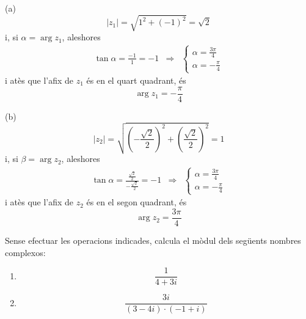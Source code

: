 \begin{solucio}
(a)
\begin{equation*}
\left\vert z_{1}\right\vert =\sqrt{1^{2}+(-1)^{2}}=\sqrt{2}
\end{equation*}
i, si $\alpha =\arg z_{1}$, aleshores
\begin{equation*}
\begin{array}{lll}
\tan \alpha =\frac{-1}{1}=-1 & \Longrightarrow & \left\{
\begin{array}{l}
\alpha =\frac{3\pi }{4} \\
\alpha =-\frac{\pi }{4}
\end{array}
\right.
\end{array}
\end{equation*}
i atès que l’afix de $z_{1}$ és en el quart quadrant, és
\begin{equation*}
\arg z_{1}=-\frac{\pi }{4}
\end{equation*}

(b)
\begin{equation*}
\left\vert z_{2}\right\vert =\sqrt{\left( -\frac{\sqrt{2}}{2}\right)
^{2}+\left( \frac{\sqrt{2}}{2}\right) ^{2}}=1
\end{equation*}
i, si $\beta =\arg z_{2}$, aleshores
\begin{equation*}
\begin{array}{lll}
\tan \alpha =\frac{\frac{\sqrt{2}}{2}}{-\frac{\sqrt{2}}{2}}=-1 &
\Longrightarrow & \left\{
\begin{array}{l}
\alpha =\frac{3\pi }{4} \\
\alpha =-\frac{\pi }{4}
\end{array}
\right.
\end{array}
\end{equation*}
i atès que l’afix de $z_{2}$ és en el segon quadrant, és
\begin{equation*}
\arg z_{2}=\frac{3\pi }{4}
\end{equation*}
\end{solucio}

\begin{exemple}
Sense efectuar les operacions indicades, calcula el mòdul dels
següents nombres complexos:

\begin{enumerate}
\item[a)]
\begin{equation*}
\frac{1}{4+3i}
\end{equation*}

\item[b)]
\begin{equation*}
\frac{3i}{(3-4i)\cdot (-1+i)}
\end{equation*}
\end{enumerate}
\end{exemple}

